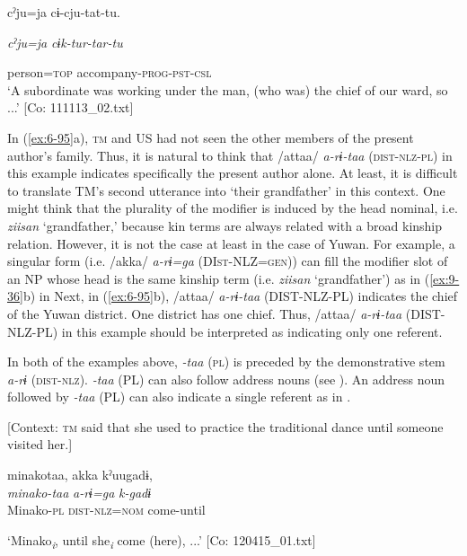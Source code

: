 \begin{table}
      cˀju=ja  cɨ-cju-tat-tu.

      \textit{cˀju=ja}  \textit{cɨk-tur-tar-tu}

      person=\textsc{top}  accompany-\textsc{prog}-\textsc{pst}-\textsc{csl}\\
\glt ‘A subordinate was working under the man, (who was) the chief of our ward, so ...’ [Co: 111113\_02.txt]
\z

In (\ref{ex:6-95}a), \textsc{tm} and US had not seen the other members of the present author’s family. Thus, it is natural to think that /attaa/ \textit{a-rɨ-taa} (\textsc{dist}-\textsc{nlz}-\textsc{pl}) in this example indicates specifically the present author alone. At least, it is difficult to translate TM’s second utterance into ‘their grandfather’ in this context. One might think that the plurality of the modifier is induced by the head nominal, i.e. \textit{ziisan} ‘grandfather,’ because kin terms are always related with a broad kinship relation. However, it is not the case at least in the case of Yuwan. For example, a singular form (i.e. /akka/ \textit{a-rɨ=ga} (DI\textsc{st}-NLZ=\textsc{gen})) can fill the modifier slot of an NP whose head is the same kinship term (i.e. \textit{ziisan} ‘grandfather’) as in (\ref{ex:9-36}b) in  Next, in (\ref{ex:6-95}b), /attaa/ \textit{a-rɨ-taa} (DIST-NLZ-PL) indicates the chief of the Yuwan district. One district has one chief. Thus, /attaa/ \textit{a-rɨ-taa} (DIST-NLZ-PL) in this example should be interpreted as indicating only one referent.

In both of the examples above, \textit{-taa} (\textsc{pl}) is preceded by the demonstrative stem \textit{a-rɨ} (\textsc{dist}-\textsc{nlz}). \textit{-taa} (PL) can also follow address nouns (see ). An address noun followed by \textit{-taa} (PL) can also indicate a single referent as in .

\ea\label{ex:6-96}
  [Context: \textsc{tm} said that she used to practice the traditional dance until someone visited her.]

{\TM}
\glll minakotaa,  akka  kˀuugadɨ,\\
\textit{minako-taa}  \textit{a-rɨ=ga}  \textit{k-gadɨ}\\

    Minako-\textsc{pl}  \textsc{dist}-\textsc{nlz}=\textsc{nom}  come-until

\glt    ‘Minako\textit{\textsubscript{i}}, until she\textit{\textsubscript{i}} come (here), ...’ [Co: 120415\_01.txt]
\z


\end{table}
